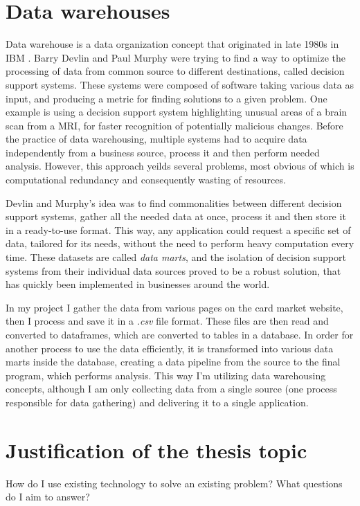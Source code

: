 \section{Data warehouses}
Data warehouse is a data organization concept that originated in late 1980s in IBM \cite{dataWarehouses}. Barry Devlin and Paul Murphy were trying to find a way to optimize the processing of data from common source to different destinations, called decision support systems. These systems were composed of software taking various data as input, and producing a metric for finding solutions to a given problem. One example is using a decision support system highlighting unusual areas of a brain scan from a MRI, for faster recognition of potentially malicious changes. Before the practice of data warehousing, multiple systems had to acquire data independently from a business source, process it and then perform needed analysis. However, this approach yeilds several problems, most obvious of which is computational redundancy and consequently wasting of resources. \par
Devlin and Murphy's idea was to find commonalities between different decision support systems, gather all the needed data at once, process it and then store it in a ready-to-use format. This way, any application could request a specific set of data, tailored for its needs, without the need to perform heavy computation every time. These datasets are called \textit{data marts}, and the isolation of decision support systems from their individual data sources proved to be a robust solution, that has quickly been implemented in businesses around the world. \par
In my project I gather the data from various pages on the card market website, then I process and save it in a \textit{.csv} file format. These files are then read and converted to dataframes, which are converted to tables in a database. In order for another process to use the data efficiently, it is transformed into various data marts inside the database, creating a data pipeline from the source to the final program, which performs analysis. This way I'm utilizing data warehousing concepts, although I am only collecting data from a single source (one process responsible for data gathering) and delivering it to a single application.


\section{Justification of the thesis topic}

How do I use existing technology to solve an existing problem?
What questions do I aim to answer?
